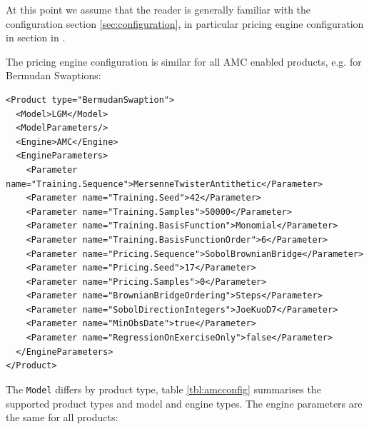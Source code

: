 At this point we assume that the reader is generally familiar with the configuration section 
\ref{sec:configuration}, in particular pricing engine configuration in section in \cite{products}.

The pricing engine configuration is similar for all AMC enabled products, e.g. for Bermudan Swaptions:

\begin{verbatim}
<Product type="BermudanSwaption">
  <Model>LGM</Model>
  <ModelParameters/>
  <Engine>AMC</Engine>
  <EngineParameters>
    <Parameter name="Training.Sequence">MersenneTwisterAntithetic</Parameter>
    <Parameter name="Training.Seed">42</Parameter>
    <Parameter name="Training.Samples">50000</Parameter>
    <Parameter name="Training.BasisFunction">Monomial</Parameter>
    <Parameter name="Training.BasisFunctionOrder">6</Parameter>
    <Parameter name="Pricing.Sequence">SobolBrownianBridge</Parameter>
    <Parameter name="Pricing.Seed">17</Parameter>
    <Parameter name="Pricing.Samples">0</Parameter>
    <Parameter name="BrownianBridgeOrdering">Steps</Parameter>
    <Parameter name="SobolDirectionIntegers">JoeKuoD7</Parameter>
    <Parameter name="MinObsDate">true</Parameter>
    <Parameter name="RegressionOnExerciseOnly">false</Parameter>
  </EngineParameters>
</Product>
\end{verbatim}

The \verb+Model+ differs by product type, table \ref{tbl:amcconfig} summarises the supported product types and model and
engine types. The engine parameters are the same for all products:

